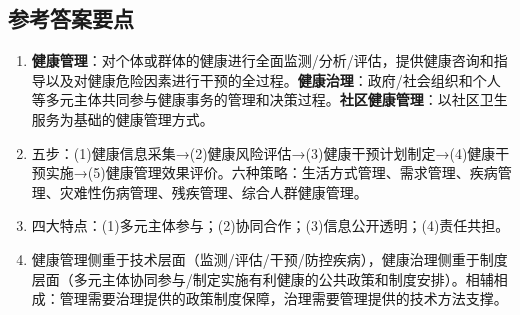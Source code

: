 \subsection*{参考答案要点}

\begin{enumerate}[leftmargin=*, itemsep=5pt]
    \item \textbf{健康管理}：对个体或群体的健康进行全面监测/分析/评估，提供健康咨询和指导以及对健康危险因素进行干预的全过程。\textbf{健康治理}：政府/社会组织和个人等多元主体共同参与健康事务的管理和决策过程。\textbf{社区健康管理}：以社区卫生服务为基础的健康管理方式。
    \item 五步：(1)健康信息采集→(2)健康风险评估→(3)健康干预计划制定→(4)健康干预实施→(5)健康管理效果评价。六种策略：生活方式管理、需求管理、疾病管理、灾难性伤病管理、残疾管理、综合人群健康管理。
    \item 四大特点：(1)多元主体参与；(2)协同合作；(3)信息公开透明；(4)责任共担。
    \item 健康管理侧重于技术层面（监测/评估/干预/防控疾病），健康治理侧重于制度层面（多元主体协同参与/制定实施有利健康的公共政策和制度安排）。相辅相成：管理需要治理提供的政策制度保障，治理需要管理提供的技术方法支撑。
\end{enumerate}

\newpage

